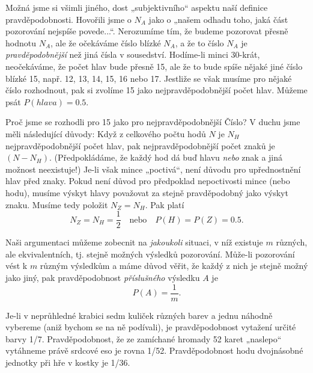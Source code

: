     Možná jsme si všimli jiného, dost „subjektivního“ aspektu naší definice pravděpodobnosti. 
    Hovořili jsme o \(N_A\) jako o „našem odhadu toho, jaká část pozorování nejspíše povede...“. 
    Nerozumíme tím, že budeme pozorovat přesně hodnotu \(N_A\), ale že očekáváme číslo blízké 
    \(N_A\), a že to číslo \(N_A\) je \emph{pravděpodobnější} než jiná čísla v sousedství. 
    Hodíme-li minci \num{30}-krát, neočekáváme, že počet hlav bude přesně \num{15}, ale že to bude 
    spíše nějaké jiné číslo blízké \num{15}, např. \num{12}, \num{13}, \num{14}, \num{15}, \num{16} 
    nebo \num{17}. Jestliže se však musíme pro nějaké číslo rozhodnout, pak si zvolíme \num{15} 
    jako nejpravděpodobnější počet hlav. Můžeme psát \(P(hlava) = \num{0.5}\).
    
    Proč jsme se rozhodli pro \num{15} jako pro nejpravděpodobnější Číslo? V duchu jsme měli 
    následující důvody: Když z celkového počtu hodů \(N\) je \(N_H\) nejpravděpodobnější počet 
    hlav, pak nejpravděpodobnější počet znaků je \((N - N_H)\). (Předpokládáme, že každý hod dá 
    buď hlavu \emph{nebo} znak a jiná možnost neexistuje!) Je-li však mince „poctivá“, není důvodu 
    pro upřednostnění hlav před znaky. Pokud není důvod pro předpoklad nepoctivosti mince (nebo 
    hodu), musíme výskyt hlavy považovat za stejně pravděpodobný jako výskyt znaku. Musíme tedy 
    položit \(N_Z = N_H\). Pak platí
    \begin{equation}\label{fyz:eq070}
      N_Z = N_H = \frac{1}{2} \quad \text{nebo}\quad P(H) = P(Z) = \num{0.5}.
    \end{equation}
    
    Naši argumentaci můžeme zobecnit na \emph{jakoukoli} situaci, v níž existuje \(m\) různých, ale 
    ekvivalentních, tj. stejně možných výsledků pozorování. Může-li pozorování vést k \(m\) různým 
    výsledkům a máme důvod věřit, že každý z nich je stejně možný jako jiný, pak pravděpodobnost 
    \emph{příslušného} výsledku \(A\) je
    \begin{equation}\label{fyz:eq071}
      P(A) = \frac{1}{m}.
    \end{equation}
    
    Je-li v neprůhledné krabici sedm kuliček různých barev a jednu náhodně vybereme (aniž bychom se 
    na ně podívali), je pravděpodobnost vytažení určité barvy \num{1/7}. Pravděpodobnost, že ze 
    zamíchané hromady \num{52} karet „naslepo“ vytáhneme právě srdcové eso je rovna \num{1/52}. 
    Pravděpodobnost hodu dvojnásobné jednotky při hře v kostky je \num{1/36}.
    
